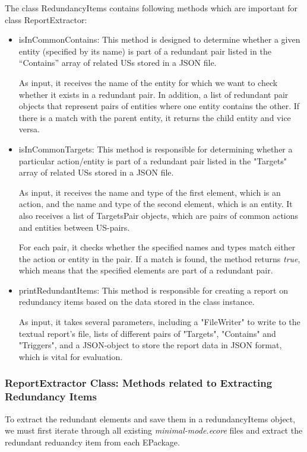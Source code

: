 The class RedundancyItems contains following methods which are important for class ReportExtractor:
\begin{itemize}
	\item isInCommonContains: This method is designed to determine whether a given entity (specified by its name) is part of a redundant pair listed in the \enquote{Contains} array of related USs stored in a JSON file.
	
	As input, it receives the name of the entity for which we want to check whether it exists in a redundant pair. In addition, a list of redundant pair objects that represent pairs of entities where one entity contains the other. If there is a match with the parent entity, it returns the child entity and vice versa.
	\item isInCommonTargets: This method is responsible for determining whether a particular action/entity is part of a redundant pair listed in the "Targets" array of related USs stored in a JSON file.
	
	As input, it receives the name and type of the first element, which is an action, and the name and type of the second element, which is an entity. It also receives a list of TargetsPair objects, which are pairs of common actions and entities between US-pairs.
	
	For each pair, it checks whether the specified names and types match either the action or entity in the pair. If a match is found, the method returns \textit{true}, which means that the specified elements are part of a redundant pair.
	\item printRedundantItems: This method is responsible for creating a report on redundancy items based on the data stored in the class instance. 
	
	As input, it takes several parameters, including a "FileWriter" to write to the textual report's file, lists of different pairs of "Targets", "Contains" and "Triggers", and a JSON-object to store the report data in JSON format, which is vital for evaluation.
\end{itemize}
\subsubsection*{ReportExtractor Class: Methods related to Extracting Redundancy Items}
To extract the redundant elements and save them in a redundancyItems object, we must first iterate through all existing \textit{minimal-mode.ecore} files and extract the redundant reduandcy item from each EPackage.

